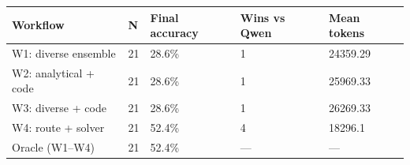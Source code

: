\begin{tabular}{lllll}
\hline
Workflow & N & Final accuracy & Wins vs Qwen & Mean tokens \\
\hline
W1: diverse ensemble & 21 & 28.6\% & 1 & 24359.29 \\
W2: analytical + code & 21 & 28.6\% & 1 & 25969.33 \\
W3: diverse + code & 21 & 28.6\% & 1 & 26269.33 \\
W4: route + solver & 21 & 52.4\% & 4 & 18296.1 \\
Oracle (W1–W4) & 21 & 52.4\% & — & — \\
\hline
\end{tabular}
